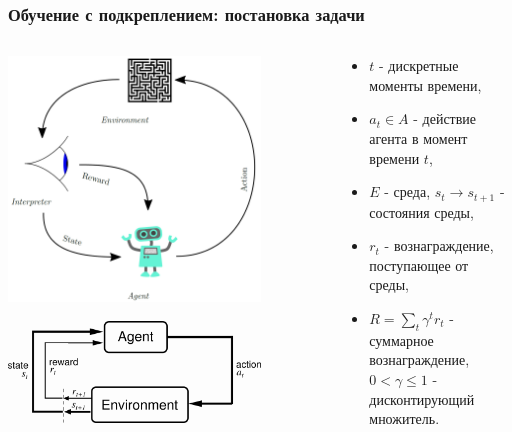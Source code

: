 \documentclass[default]{beamer}
\begin{document}
	\begin{frame}
		\frametitle{Обучение с подкреплением: постановка задачи}
		
		\begin{columns}
			\begin{column}{0.6\textwidth}
				\centering
				\includegraphics[width=0.8\textwidth]{rl_simple.png}
				
				\par\bigskip
				
				\includegraphics[width=0.8\textwidth]{rl_intro.png}
			\end{column}
			\begin{column}{0.5\textwidth}
				\begin{itemize}
					\item $t$ - дискретные моменты времени,
					\item $a_t\in A$ - действие агента в момент времени $t$,
					\item $E$ - среда, $s_t\rightarrow s_{t+1}$ - состояния среды,
					\item $r_t$ - вознаграждение, поступающее от среды,
					\item $R=\sum\limits_{t}{{{\gamma }^{t}}}{{r}_{t}}$ - суммарное вознаграждение, $0<\gamma \le 1$  - дисконтирующий множитель.
				\end{itemize}
			\end{column}

		\end{columns}
		
	\end{frame}	
\end{document}
